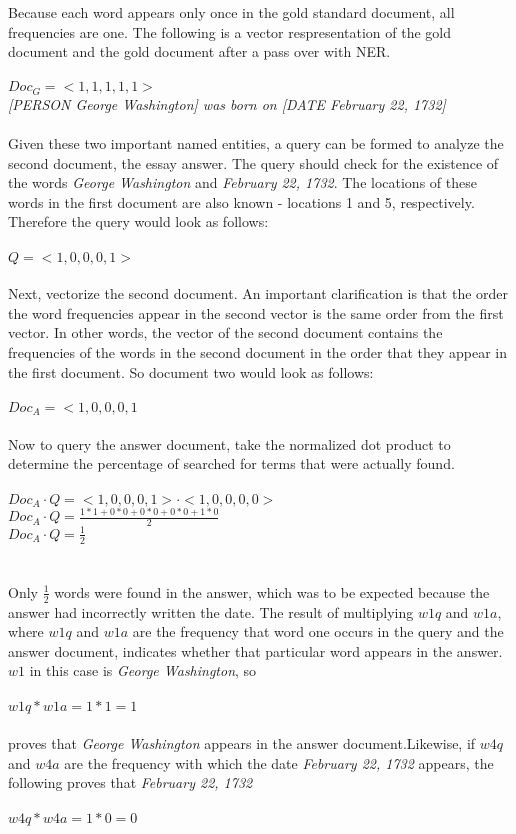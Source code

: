 Because each word appears only once in the gold standard document, all frequencies are one. The following is a vector respresentation of the gold document and the gold document after a pass over with NER.
\\\\
$Doc_G=<1, 1, 1, 1, 1>$\\
\textit{[PERSON George Washington] was born on [DATE February 22, 1732]}
\\\\
Given these two important named entities, a query can be formed to analyze the second document, the essay answer. The query should check for the existence of the words \textit{George Washington} and \textit{February 22, 1732}. The locations of these words in the first document are also known - locations 1 and 5, respectively. Therefore the query would look as follows:
\\\\
$Q=<1, 0, 0 , 0, 1>$
\\\\
Next, vectorize the second document. An important clarification is that the order the word frequencies appear in the second vector is the same order from the first vector. In other words, the vector of the second document contains the frequencies of the words in the second document in the order that they appear in the first document. So document two would look as follows:
\\\\
$Doc_A=<1, 0, 0, 0, 1$
\\\\
Now to query the answer document, take the normalized dot product to determine the percentage of searched for terms that were actually found.
\\\\
$Doc_A \cdot Q = <1, 0, 0, 0, 1> \cdot <1, 0, 0, 0, 0>$\\
$Doc_A \cdot Q = \frac{1*1 + 0*0 + 0*0 + 0*0 + 1*0}{2} $\\
$Doc_A \cdot Q = \frac{1}{2}$\\
\\\\
Only $\frac{1}{2}$ words were found in the answer, which was to be expected because the answer had incorrectly written the date. The result of multiplying $w1q$ and $w1a$, where $w1q$ and $w1a$ are the frequency that word one occurs in the query and the answer document, indicates whether that particular word appears in the answer. $w1$ in this case is \textit{George Washington}, so
\\\\
$w1q * w1a = 1*1 = 1$
\\\\
proves that \textit{George Washington} appears in the answer document.Likewise, if $w4q$ and $w4a$ are the frequency with which the date \textit{February 22, 1732} appears, the following proves that \textit{February 22, 1732}
\\\\
$w4q * w4a = 1*0 = 0$
\\\


